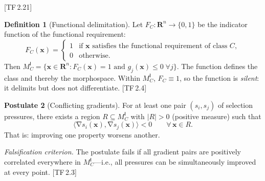 \documentclass[10pt]{article}
\theoremstyle{definition}
\newtheorem{definition}{Definition}[section]
\newtheorem{postulate}[definition]{Postulate}
\theoremstyle{plain}
\theoremstyle{remark}
\newcommand{\MC}{M^{\mathsf{I}}_C}          %
\providecommand{\Rn}{}
\renewcommand{\Rn}{\mathbf{R}^n}            %
\newcommand{\inner}[2]{\langle #1, #2 \rangle}
\newcommand{\abs}[1]{\lvert #1 \rvert}
\DeclareMathOperator{\grad}{\nabla}
\newcommand{\TF}[1]{\textnormal{[TF\,#1]}}  %
\begin{document}
\TF{2.21}

\begin{definition}[Functional delimitation]\label{def:2.5}
Let $F_C : \Rn \to \{0, 1\}$ be the indicator function of the
functional requirement:
\[
  F_C(\bm{x}) =
  \begin{cases}
    1 & \text{if } \bm{x} \text{ satisfies the functional requirement
        of class } C, \\
    0 & \text{otherwise.}
  \end{cases}
\]
Then $\MC = \{\bm{x} \in \Rn : F_C(\bm{x}) = 1 \text{ and }
g_j(\bm{x}) \leq 0 \; \forall j\}$.
The function defines the class and thereby the morphospace.
Within $\MC$, $F_C \equiv 1$, so the function is \emph{silent}:
it delimits but does not differentiate. \TF{2.4}
\end{definition}

\begin{postulate}[Conflicting gradients]\label{post:2.6}
For at least one pair $(s_i, s_j)$ of selection pressures, there exists
a region $R \subseteq \MC$ with $\abs{R} > 0$ (positive measure) such
that
\[
  \inner{\grad s_i(\bm{x})}{\grad s_j(\bm{x})} < 0
  \qquad \forall\, \bm{x} \in R.
\]
That is: improving one property worsens another.

\medskip\noindent
\textit{Falsification criterion.}
The postulate fails if all gradient pairs are positively correlated
everywhere in $\MC$---i.e., all pressures can be simultaneously improved
at every point. \TF{2.3}
\end{postulate}
\end{document}
